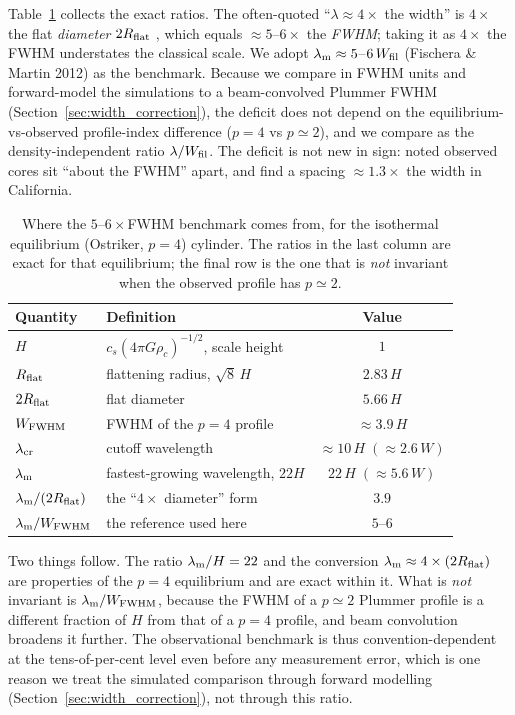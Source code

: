 \documentclass[usenatbib,twoside,twocolumn]{mnras}
\begin{document}
Table~\ref{tab:benchmark} collects the exact ratios. The often-quoted ``$\lambda\approx4\times$ the width'' is $4\times$ the flat \emph{diameter} $2R_{\rm flat}$ \citep{Inutsuka1992}, which equals $\approx5$--$6\times$ the \emph{FWHM}; taking it as $4\times$ the FWHM understates the classical scale. We adopt $\lambda_{\rm m}\approx5$--$6\,W_{\rm fil}$ (Fischera \& Martin 2012) as the benchmark. Because we compare in FWHM units and forward-model the simulations to a beam-convolved Plummer FWHM (Section~\ref{sec:width_correction}), the deficit does not depend on the equilibrium-vs-observed profile-index difference ($p=4$ vs $p\simeq2$), and we compare as the density-independent ratio $\lambda/W_{\rm fil}$. The deficit is not new in sign: \citet{Fischera2012} noted observed cores sit ``about the FWHM'' apart, and \citet{Zhang2023cal} find a spacing $\approx1.3\times$ the width in California.

\begin{table}
\caption{Where the $5$--$6\times$FWHM benchmark comes from, for the isothermal equilibrium (Ostriker, $p=4$) cylinder. The ratios in the last column are exact for that equilibrium; the final row is the one that is \emph{not} invariant when the observed profile has $p\simeq2$.}
\label{tab:benchmark}
\footnotesize
\setlength{\tabcolsep}{4pt}
\begin{tabular}{llc}
\toprule
Quantity & Definition & Value \\
\midrule
$H$ & $c_s(4\pi G\rho_c)^{-1/2}$, scale height & $1$ \\
$R_{\rm flat}$ & flattening radius, $\sqrt{8}\,H$ & $2.83\,H$ \\
$2R_{\rm flat}$ & flat diameter & $5.66\,H$ \\
$W_{\rm FWHM}$ & FWHM of the $p=4$ profile & $\approx3.9\,H$ \\
$\lambda_{\rm cr}$ & cutoff wavelength & $\approx10\,H\;(\approx2.6\,W)$ \\
$\lambda_{\rm m}$ & fastest-growing wavelength, $22H$ & $22\,H\;(\approx5.6\,W)$ \\
\midrule
$\lambda_{\rm m}/(2R_{\rm flat})$ & the ``$4\times$ diameter'' form & $3.9$ \\
$\lambda_{\rm m}/W_{\rm FWHM}$ & the reference used here & $5$--$6$ \\
\bottomrule
\end{tabular}
\end{table}

Two things follow. The ratio $\lambda_{\rm m}/H=22$ and the conversion $\lambda_{\rm m}\approx4\times(2R_{\rm flat})$ are properties of the $p=4$ equilibrium and are exact within it. What is \emph{not} invariant is $\lambda_{\rm m}/W_{\rm FWHM}$, because the FWHM of a $p\simeq2$ Plummer profile is a different fraction of $H$ from that of a $p=4$ profile, and beam convolution broadens it further. The observational benchmark is thus convention-dependent at the tens-of-per-cent level even before any measurement error, which is one reason we treat the simulated comparison through forward modelling (Section~\ref{sec:width_correction}), not through this ratio.
\end{document}
